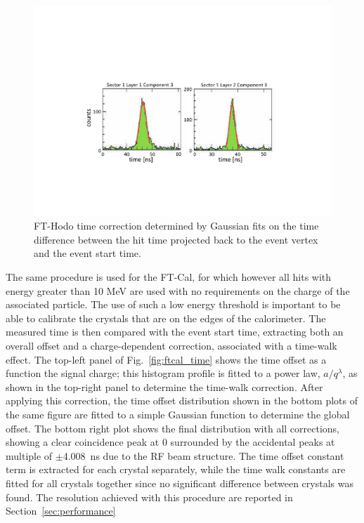 \begin{figure}
\includegraphics[width=1.0\columnwidth]{fig/fthodo_time.pdf}
\caption{FT-Hodo time correction determined by Gaussian fits on the time difference between the hit time
  projected back to the event vertex and the event start time.}
\label{fig:fthodo_time}
\end{figure}

The same procedure is used for the FT-Cal, for which however all hits with energy greater than 10 MeV are used
with no requirements on the charge of the associated particle. The use of such a low energy threshold is important
to be able to calibrate the crystals that are on the edges of the calorimeter. The measured time is then compared
with the event start time, extracting both an overall offset and a charge-dependent correction, associated with a
time-walk effect. The top-left panel of Fig.~\ref{fig:ftcal_time} shows the time offset as  a function the
signal charge; this histogram profile is fitted to a power law, $a/q^\lambda$, as shown in the top-right panel to
determine the time-walk correction. After applying this correction, the time offset distribution shown in the bottom
plots  of the same figure are fitted to a simple Gaussian function to determine the global offset. The bottom right
plot shows the final distribution with all corrections, showing a clear  coincidence peak at 0 surrounded by the
accidental peaks at multiple of $\pm$4.008~ns  due to the RF beam structure. The time offset constant term is
extracted for each crystal separately, while the time walk constants are fitted for all crystals together since no
significant difference between crystals was found. The resolution achieved with this procedure are reported in Section~\ref{sec:performance}

